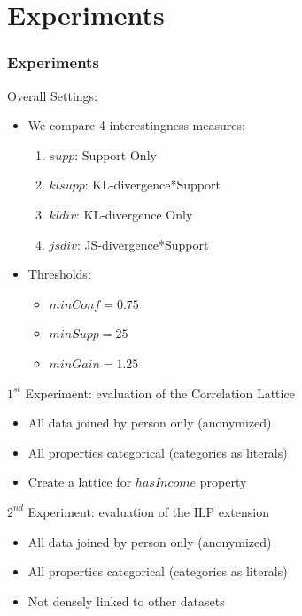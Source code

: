 \documentclass{beamer}
\begin{document}
\section{Experiments}
\begin{frame}
\frametitle{Experiments}
  Overall Settings:
  \begin{itemize}
   \item We compare 4 interestingness measures:
   \begin{enumerate}
    \item $supp$: Support Only
    \item $klsupp$: KL-divergence*Support
    \item $kldiv$: KL-divergence Only
    \item $jsdiv$: JS-divergence*Support
   \end{enumerate}
   \item Thresholds:
   \begin{itemize}
    \item $minConf=0.75$
    \item $minSupp=25$
    \item $minGain=1.25$
   \end{itemize}


  \end{itemize}

  $1^{st}$ Experiment: evaluation of the Correlation Lattice
  \begin{itemize}
   \item All data joined by person only (anonymized)
   \item All properties categorical (categories as literals)
   \item Create a lattice for $hasIncome$ property
  \end{itemize}
  $2^{nd}$ Experiment: evaluation of the ILP extension
  \begin{itemize}
   \item All data joined by person only (anonymized)
   \item All properties categorical (categories as literals)
   \item Not densely linked to other datasets
  \end{itemize}
\end{frame}
\end{document}
